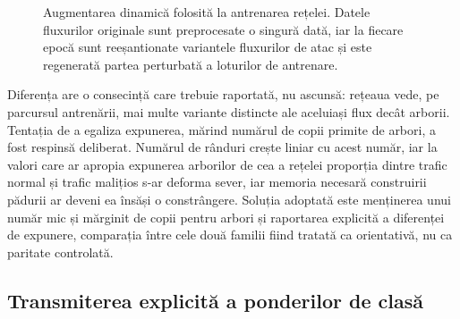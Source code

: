 \begin{figure}[!ht]
    \centering
\caption{Augmentarea dinamică folosită la antrenarea rețelei. Datele fluxurilor originale sunt preprocesate o singură dată, iar la fiecare epocă sunt reeșantionate variantele fluxurilor de atac și este regenerată partea perturbată a loturilor de antrenare.}    \label{fig:augmentare}
\end{figure}

Diferența are o consecință care trebuie raportată, nu ascunsă: rețeaua vede, pe parcursul antrenării, mai multe variante distincte ale aceluiași flux decât arborii. Tentația de a egaliza expunerea, mărind numărul de copii primite de arbori, a fost respinsă deliberat. Numărul de rânduri crește liniar cu acest număr, iar la valori care ar apropia expunerea arborilor de cea a rețelei proporția dintre trafic normal și trafic malițios s-ar deforma sever, iar memoria necesară construirii pădurii ar deveni ea însăși o constrângere. Soluția adoptată este menținerea unui număr mic și mărginit de copii pentru arbori și raportarea explicită a diferenței de expunere, comparația între cele două familii fiind tratată ca orientativă, nu ca paritate controlată.

\subsection{Transmiterea explicită a ponderilor de clasă}\label{subsec:implponderi}

